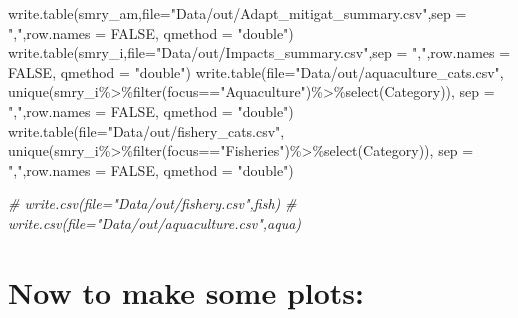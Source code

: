 \documentclass[
]{article}
\newenvironment{Shaded}{\begin{snugshade}}{\end{snugshade}}
\newcommand{\AttributeTok}[1]{\textcolor[rgb]{0.77,0.63,0.00}{#1}}
\newcommand{\CommentTok}[1]{\textcolor[rgb]{0.56,0.35,0.01}{\textit{#1}}}
\newcommand{\ConstantTok}[1]{\textcolor[rgb]{0.00,0.00,0.00}{#1}}
\newcommand{\FunctionTok}[1]{\textcolor[rgb]{0.00,0.00,0.00}{#1}}
\newcommand{\NormalTok}[1]{#1}
\newcommand{\SpecialCharTok}[1]{\textcolor[rgb]{0.00,0.00,0.00}{#1}}
\newcommand{\StringTok}[1]{\textcolor[rgb]{0.31,0.60,0.02}{#1}}
\begin{document}
\begin{Shaded}
\begin{Highlighting}[]
    \FunctionTok{write.table}\NormalTok{(smry\_am,}\AttributeTok{file=}\StringTok{"Data/out/Adapt\_mitigat\_summary.csv"}\NormalTok{,}\AttributeTok{sep =} \StringTok{","}\NormalTok{,}\AttributeTok{row.names =} \ConstantTok{FALSE}\NormalTok{, }\AttributeTok{qmethod =} \StringTok{"double"}\NormalTok{)}
    \FunctionTok{write.table}\NormalTok{(smry\_i,}\AttributeTok{file=}\StringTok{"Data/out/Impacts\_summary.csv"}\NormalTok{,}\AttributeTok{sep =} \StringTok{","}\NormalTok{,}\AttributeTok{row.names =} \ConstantTok{FALSE}\NormalTok{, }\AttributeTok{qmethod =} \StringTok{"double"}\NormalTok{)}
    \FunctionTok{write.table}\NormalTok{(}\AttributeTok{file=}\StringTok{"Data/out/aquaculture\_cats.csv"}\NormalTok{,}
              \FunctionTok{unique}\NormalTok{(smry\_i}\SpecialCharTok{\%\textgreater{}\%}\FunctionTok{filter}\NormalTok{(focus}\SpecialCharTok{==}\StringTok{"Aquaculture"}\NormalTok{)}\SpecialCharTok{\%\textgreater{}\%}\FunctionTok{select}\NormalTok{(Category)),}
              \AttributeTok{sep =} \StringTok{","}\NormalTok{,}\AttributeTok{row.names =} \ConstantTok{FALSE}\NormalTok{,  }\AttributeTok{qmethod =} \StringTok{"double"}\NormalTok{)}
   \FunctionTok{write.table}\NormalTok{(}\AttributeTok{file=}\StringTok{"Data/out/fishery\_cats.csv"}\NormalTok{,}
              \FunctionTok{unique}\NormalTok{(smry\_i}\SpecialCharTok{\%\textgreater{}\%}\FunctionTok{filter}\NormalTok{(focus}\SpecialCharTok{==}\StringTok{"Fisheries"}\NormalTok{)}\SpecialCharTok{\%\textgreater{}\%}\FunctionTok{select}\NormalTok{(Category)),}
              \AttributeTok{sep =} \StringTok{","}\NormalTok{,}\AttributeTok{row.names =} \ConstantTok{FALSE}\NormalTok{,  }\AttributeTok{qmethod =} \StringTok{"double"}\NormalTok{)}

   \CommentTok{\# write.csv(file="Data/out/fishery.csv",fish)}
   \CommentTok{\# write.csv(file="Data/out/aquaculture.csv",aqua)}
\end{Highlighting}
\end{Shaded}

\hypertarget{now-to-make-some-plots}{%
\section{Now to make some plots:}\label{now-to-make-some-plots}}
\end{document}
